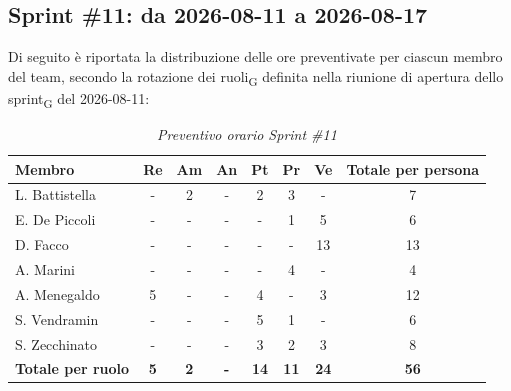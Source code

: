 ﻿\documentclass[a4paper, 10pt, colorlinks=true, linkcolor=black, urlcolor=blue, citecolor=blue, hidelinks]{article}
\renewcommand{\arraystretch}{1.2}
\begin{document}
\subsection{Sprint \#11: da 2026-08-11 a 2026-08-17}
Di seguito è riportata la distribuzione delle ore preventivate per ciascun membro del team, secondo la rotazione dei ruoli\textsubscript{G} definita nella riunione di apertura dello sprint\textsubscript{G} del 2026-08-11:

\begin{table}[H]
    \centering
    \renewcommand{\arraystretch}{1.4}
    \begin{tabular}{|l|c|c|c|c|c|c|c|}
        \hline
        \rowcolor{bluBitless!15}
        \textbf{Membro} & \textbf{Re} & \textbf{Am} & \textbf{An} & \textbf{Pt} & \textbf{Pr} & \textbf{Ve} & \textbf{Totale per persona} \\
        \hline
        L. Battistella & - & 2 & - & 2 & 3 & - & 7 \\ \hline
        E. De Piccoli & - & - & - & - & 1 & 5 & 6 \\ \hline
        D. Facco & - & - & - & - & - & 13 & 13 \\ \hline
        A. Marini & - & - & - & - & 4 & - & 4 \\ \hline
        A. Menegaldo & 5 & - & - & 4 & - & 3 & 12 \\ \hline
        S. Vendramin & - & - & - & 5 & 1 & - & 6 \\ \hline
        S. Zecchinato & - & - & - & 3 & 2 & 3 & 8 \\ \hline
        \rowcolor{bluBitless!8}
        \textbf{Totale per ruolo} & \textbf{5} & \textbf{2} & \textbf{-} & \textbf{14} & \textbf{11} & \textbf{24} & \textbf{56} \\
        \hline
    \end{tabular}
    \caption{\textit{Preventivo orario Sprint \#11}}
\end{table}
\end{document}
